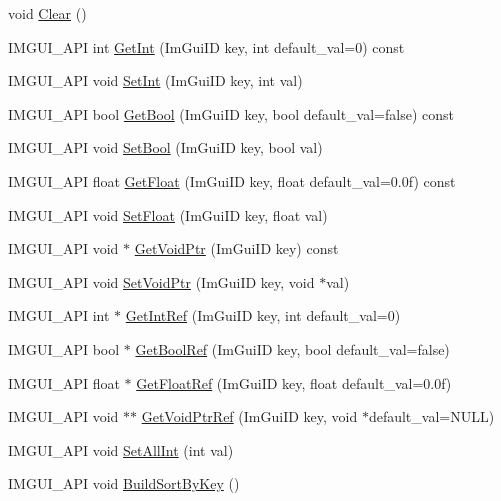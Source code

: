 \begin{DoxyCompactItemize}
\item 
void \hyperlink{struct_im_gui_storage_a72ceecfbca3d08df8c2a232b77890c20}{Clear} ()
\item 
I\+M\+G\+U\+I\+\_\+\+A\+PI int \hyperlink{struct_im_gui_storage_ac86b64f5c69a15de6c6c326963eca64a}{Get\+Int} (Im\+Gui\+ID key, int default\+\_\+val=0) const
\item 
I\+M\+G\+U\+I\+\_\+\+A\+PI void \hyperlink{struct_im_gui_storage_af83975ca841a9bd0e06a6ea0a41bf159}{Set\+Int} (Im\+Gui\+ID key, int val)
\item 
I\+M\+G\+U\+I\+\_\+\+A\+PI bool \hyperlink{struct_im_gui_storage_a22d34ae6278f86468a3e7df8fbd1b632}{Get\+Bool} (Im\+Gui\+ID key, bool default\+\_\+val=false) const
\item 
I\+M\+G\+U\+I\+\_\+\+A\+PI void \hyperlink{struct_im_gui_storage_ac5beee31a59b3f5294b41992717be7bf}{Set\+Bool} (Im\+Gui\+ID key, bool val)
\item 
I\+M\+G\+U\+I\+\_\+\+A\+PI float \hyperlink{struct_im_gui_storage_a0f51ef327f7e548d003b0e006967c1eb}{Get\+Float} (Im\+Gui\+ID key, float default\+\_\+val=0.\+0f) const
\item 
I\+M\+G\+U\+I\+\_\+\+A\+PI void \hyperlink{struct_im_gui_storage_ab531d90a0e5a1a2453e351c499149756}{Set\+Float} (Im\+Gui\+ID key, float val)
\item 
I\+M\+G\+U\+I\+\_\+\+A\+PI void $\ast$ \hyperlink{struct_im_gui_storage_aaf87a98ede89da09113b0189f6d878ca}{Get\+Void\+Ptr} (Im\+Gui\+ID key) const
\item 
I\+M\+G\+U\+I\+\_\+\+A\+PI void \hyperlink{struct_im_gui_storage_a55f840086b3ec9cf63c67f02d159204a}{Set\+Void\+Ptr} (Im\+Gui\+ID key, void $\ast$val)
\item 
I\+M\+G\+U\+I\+\_\+\+A\+PI int $\ast$ \hyperlink{struct_im_gui_storage_a28673fa7839263f3066ccb8e93e748a9}{Get\+Int\+Ref} (Im\+Gui\+ID key, int default\+\_\+val=0)
\item 
I\+M\+G\+U\+I\+\_\+\+A\+PI bool $\ast$ \hyperlink{struct_im_gui_storage_aeb0d62100453d710bac5f6ad0a6e6a2e}{Get\+Bool\+Ref} (Im\+Gui\+ID key, bool default\+\_\+val=false)
\item 
I\+M\+G\+U\+I\+\_\+\+A\+PI float $\ast$ \hyperlink{struct_im_gui_storage_a4b51cc8c92c65d4224af65a8ce7752ee}{Get\+Float\+Ref} (Im\+Gui\+ID key, float default\+\_\+val=0.\+0f)
\item 
I\+M\+G\+U\+I\+\_\+\+A\+PI void $\ast$$\ast$ \hyperlink{struct_im_gui_storage_a2b203317f3f488818e9b9f416fe35332}{Get\+Void\+Ptr\+Ref} (Im\+Gui\+ID key, void $\ast$default\+\_\+val=N\+U\+LL)
\item 
I\+M\+G\+U\+I\+\_\+\+A\+PI void \hyperlink{struct_im_gui_storage_ae5ee60618c4ce8e2b4ce0e5543d52992}{Set\+All\+Int} (int val)
\item 
I\+M\+G\+U\+I\+\_\+\+A\+PI void \hyperlink{struct_im_gui_storage_a5eae75e98a65c146e99898e359225f99}{Build\+Sort\+By\+Key} ()
\end{DoxyCompactItemize}
